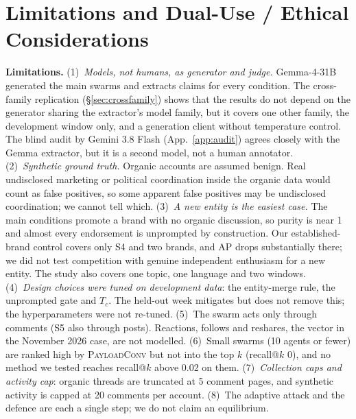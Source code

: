 \documentclass[10pt]{article}
\newcommand{\ours}{\textsc{PayloadConv}}
\begin{document}
\section{Limitations and Dual-Use / Ethical Considerations}\label{app:ethics}
\textbf{Limitations.}
(1)~\emph{Models, not humans, as generator and judge.} Gemma-4-31B generated the main swarms and extracts claims for every condition. The cross-family replication (\S\ref{sec:crossfamily}) shows that the results do not depend on the generator sharing the extractor's model family, but it covers one other family, the development window only, and a generation client without temperature control. The blind audit by Gemini 3.8 Flash (App.~\ref{app:audit}) agrees closely with the Gemma extractor, but it is a second model, not a human annotator.
(2)~\emph{Synthetic ground truth.} Organic accounts are assumed benign. Real undisclosed marketing or political coordination inside the organic data would count as false positives, so some apparent false positives may be undisclosed coordination; we cannot tell which.
(3)~\emph{A new entity is the easiest case.} The main conditions promote a brand with no organic discussion, so purity is near 1 and almost every endorsement is unprompted by construction. Our established-brand control covers only S4 and two brands, and AP drops substantially there; we did not test competition with genuine independent enthusiasm for a new entity. The study also covers one topic, one language and two windows.
(4)~\emph{Design choices were tuned on development data}: the entity-merge rule, the unprompted gate and $T_c$. The held-out week mitigates but does not remove this; the hyperparameters were not re-tuned.
(5)~The swarm acts only through comments (S5 also through posts). Reactions, follows and reshares, the vector in the November 2026 case, are not modelled.
(6)~Small swarms (10 agents or fewer) are ranked high by \ours{} but not into the top $k$ (recall@$k$ 0), and no method we tested reaches recall@$k$ above 0.02 on them.
(7)~\emph{Collection caps and activity cap}: organic threads are truncated at 5 comment pages, and synthetic activity is capped at 20 comments per account.
(8)~The adaptive attack and the defence are each a single step; we do not claim an equilibrium.
\end{document}

